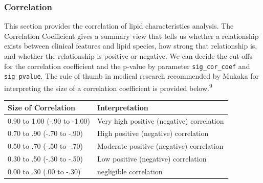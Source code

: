 \documentclass[]{article}
\begin{document}
\hypertarget{correlation-1}{%
\subsubsection{Correlation}\label{correlation-1}}

This section provides the correlation of lipid characteristics analysis. The Correlation Coefficient gives a summary view that tells us whether a relationship exists between clinical features and lipid species, how strong that relationship is, and whether the relationship is positive or negative. We can decide the cut-offs for the correlation coefficient and the p-value by parameter \texttt{sig\_cor\_coef} and \texttt{sig\_pvalue}. The rule of thumb in medical research recommended by Mukaka for interpreting the size of a correlation coefficient is provided below.\textsuperscript{9}

\begin{longtable}[]{@{}ll@{}}
\toprule
Size of Correlation & Interpretation\tabularnewline
\midrule
\endhead
0.90 to 1.00 (-.90 to -1.00) & Very high positive (negative) correlation\tabularnewline
0.70 to .90 (-.70 to -.90) & High positive (negative) correlation\tabularnewline
0.50 to .70 (-.50 to -.70) & Moderate positive (negative) correlation\tabularnewline
0.30 to .50 (-.30 to -.50) & Low positive (negative) correlation\tabularnewline
0.00 to .30 (.00 to -.30) & negligible correlation\tabularnewline
\bottomrule
\end{longtable}
\end{document}
